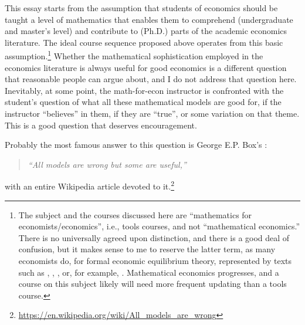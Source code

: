 \documentclass[10pt]{article}
\begin{document}
This essay starts from the assumption that students of economics should be taught a level of mathematics that enables them to comprehend (undergraduate and master's level) and contribute to (Ph.D.) parts of the academic economics literature. The ideal course sequence proposed above operates from this basic assumption.\footnote{The subject and the courses discussed here are ``mathematics for economists/economics'', i.e., tools courses, and not ``mathematical economics.'' There is no universally agreed upon distinction, and there is a good deal of confusion, but it makes sense to me to reserve the latter term, as many economists do, for formal economic equilibrium theory, represented by texts such as \cite{Debreu1959}, \cite{Arrow1963}, \cite{Arrow1981,Arrow1982,Arrow1986}, or, for example, \cite{Stigum1990}. Mathematical economics progresses, and a course on this subject likely will need more frequent updating than a tools course.} Whether the mathematical sophistication employed in the economics literature is always useful for good economics is a different question that reasonable people can argue about, and I do not address that question here. Inevitably, at some point, the math-for-econ instructor is confronted with the student's question of what all these mathematical models are good for, if the instructor ``believes'' in them, if they are ``true'', or some variation on that theme. This is a good question that deserves encouragement.

Probably the most famous answer to this question is George E.P. Box's \citep{BOX1979201}:

\begin{quote}\it
``All models are wrong but some are useful,'' 
\end{quote}
with an entire Wikipedia article devoted to it.\footnote{\url{https://en.wikipedia.org/wiki/All_models_are_wrong}}
\end{document}
